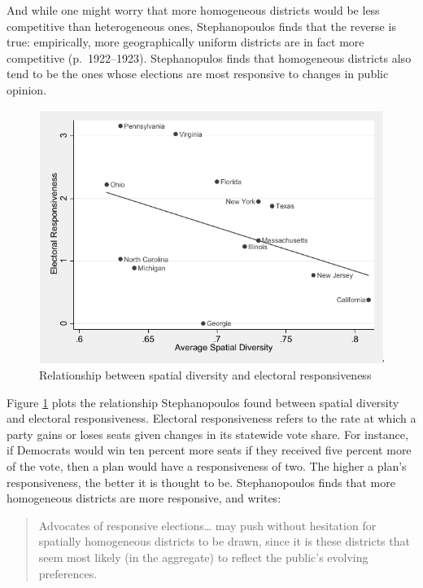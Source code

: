 \documentclass[]{article}
\begin{document}
And while one might worry that more homogeneous districts would be less
competitive than heterogeneous ones, Stephanopoulos finds that the
reverse is true: empirically, more geographically uniform districts are
in fact more competitive (p.~1922--1923). Stephanopulos finds that
homogeneous districts also tend to be the ones whose elections are most
responsive to changes in public opinion.

\begin{figure}
\centering
\includegraphics{./img/average_spatial-diversity.png}
\caption{Relationship between spatial diversity and electoral
responsiveness\label{sd_responsiveness}}
\end{figure}

Figure \ref{sd_responsiveness} plots the relationship Stephanopoulos
found between spatial diversity and electoral responsiveness. Electoral
responsiveness refers to the rate at which a party gains or loses seats
given changes in its statewide vote share. For instance, if Democrats
would win ten percent more seats if they received five percent more of
the vote, then a plan would have a responsiveness of two. The higher a
plan's responsiveness, the better it is thought to be. Stephanopoulos
finds that more homogeneous districts are more responsive, and writes:

\begin{quote}
Advocates of responsive elections\ldots{} may push without hesitation
for spatially homogeneous districts to be drawn, since it is these
districts that seem most likely (in the aggregate) to reflect the
public's evolving preferences.
\end{quote}
\end{document}
